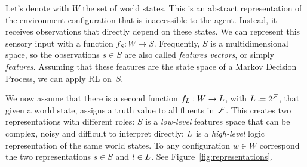 Let's denote with $W$ the set of world states. This is an abstract
representation of the environment configuration that is inaccessible to the
agent. Instead, it receives observations that directly depend on these states.
We can represent this sensory input with a function $f_S: W \to S$.
Frequently, $S$ is a multidimensional space, so the observations $s \in S$ are
also called \emph{features vectors}, or simply \emph{features}. Assuming that
these features are the state space of a Markov Decision Process, we can apply
RL on~$S$.

We now assume that there is a second function $f_L: W \to
L$, with $L \coloneqq 2^{\mathcal{F}}$, that given a world
state, assigns a truth value to all fluents in~$\mathcal{F}$.  This creates two
representations with different roles: $S$ is a \emph{low-level} features space
that can be complex, noisy and difficult to interpret directly; $L$
is a \emph{high-level} logic representation of the same world states. To any
configuration $w \in W$ correspond the two representations $s \in S$ and $l
\in L$. See Figure~\ref{fig:representations}.

